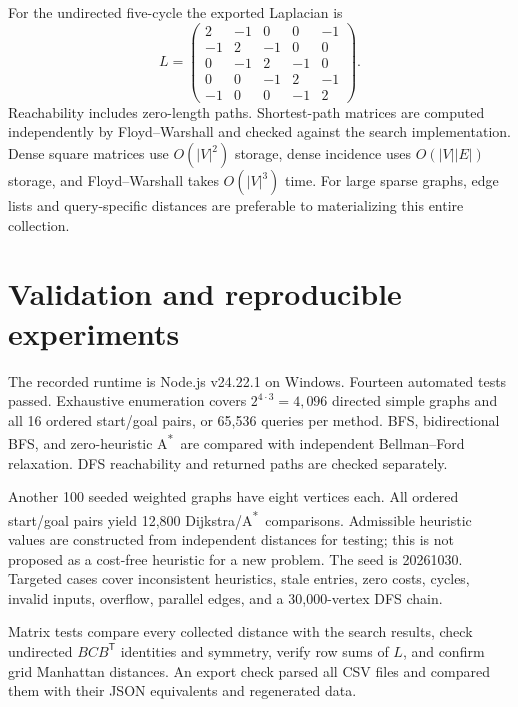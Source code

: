 \documentclass[11pt,a4paper]{article}
\newcommand{\astar}{A\textsuperscript{*}}
\begin{document}
For the undirected five-cycle the exported Laplacian is
\[
 L=\begin{pmatrix}
2&-1&0&0&-1\\
-1&2&-1&0&0\\
0&-1&2&-1&0\\
0&0&-1&2&-1\\
-1&0&0&-1&2
\end{pmatrix}.
\]
Reachability includes zero-length paths. Shortest-path matrices are computed independently by Floyd--Warshall and checked against the search implementation. Dense square matrices use $O(|V|^2)$ storage, dense incidence uses $O(|V||E|)$ storage, and Floyd--Warshall takes $O(|V|^3)$ time. For large sparse graphs, edge lists and query-specific distances are preferable to materializing this entire collection.

\section{Validation and reproducible experiments}
The recorded runtime is Node.js v24.22.1 on Windows. Fourteen automated tests passed. Exhaustive enumeration covers $2^{4\cdot3}=4,096$ directed simple graphs and all 16 ordered start/goal pairs, or 65,536 queries per method. BFS, bidirectional BFS, and zero-heuristic \astar\ are compared with independent Bellman--Ford relaxation. DFS reachability and returned paths are checked separately.

Another 100 seeded weighted graphs have eight vertices each. All ordered start/goal pairs yield 12,800 Dijkstra/\astar\ comparisons. Admissible heuristic values are constructed from independent distances for testing; this is not proposed as a cost-free heuristic for a new problem. The seed is 20261030. Targeted cases cover inconsistent heuristics, stale entries, zero costs, cycles, invalid inputs, overflow, parallel edges, and a 30,000-vertex DFS chain.

Matrix tests compare every collected distance with the search results, check undirected $BCB^{\mathsf T}$ identities and symmetry, verify row sums of $L$, and confirm grid Manhattan distances. An export check parsed all CSV files and compared them with their JSON equivalents and regenerated data.
\end{document}
